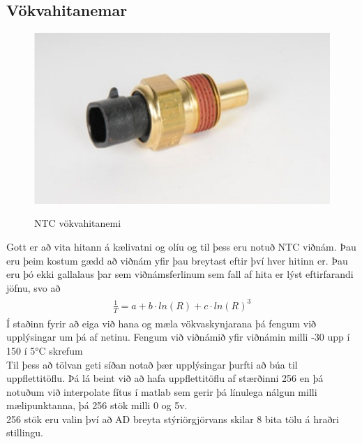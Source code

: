 \documentclass[paper=a4, fontsize=11pt]{scrartcl}
\numberwithin{equation}{section}		%
\numberwithin{figure}{section}			%
\numberwithin{table}{section}				%
\begin{document}
\subsection{Vökvahitanemar}
\begin{figure}
  \begin{center}
    \includegraphics[]{ntc.jpg}\\
    \caption{NTC vökvahitanemi}
  \end{center}
\end{figure}
Gott er að vita hitann á kælivatni og olíu og til þess eru notuð NTC viðnám. Þau eru þeim kostum gædd að viðnám yfir þau breytast eftir því hver hitinn er. Þau eru þó ekki gallalaus þar sem viðnámsferlinum sem fall af hita er lýst eftirfarandi jöfnu, svo að 
\begin{align} 
	\begin{split}
	\frac{1}{T} = a + b \cdot ln(R) + c \cdot ln(R)^3
	\end{split}					
\end{align}
Í staðinn fyrir að eiga við hana og mæla vökvaskynjarana þá fengum við upplýsingar um þá af netinu. Fengum við viðnámið yfir viðnámin milli -30 upp í 150 í 5°C skrefum\\
Til þess að tölvan geti síðan notað þær upplýsingar þurfti að búa til uppflettitöflu. Þá lá beint við að hafa uppflettitöflu af stærðinni 256 en þá notuðum við interpolate fítus í matlab sem gerir þá línulega nálgun milli mælipunktanna, þá 256 stök milli 0 og 5v. \\
256 stök eru valin því að AD breyta stýriörgjörvans skilar 8 bita tölu á hraðri stillingu. 
\end{document}
